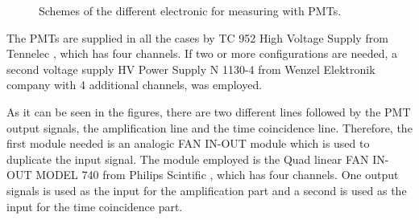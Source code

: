 \begin{figure}[htbp]
 \centering
    \newline  
    \newline
 \caption{Schemes of the different electronic for measuring with PMTs.}
 \label{fig:ElectronicConfiguraitonsPMT}
\end{figure}

The PMTs are supplied in all the cases by TC 952 High Voltage Supply from Tennelec \cite{DataSheetHVSupplyTennelec}, which has four channels. If two or more configurations are needed, a second voltage supply HV Power Supply N 1130-4 from Wenzel Elektronik company \cite{DataSheetHVSupplyWenzel} with 4 additional channels, was employed. 

As it can be seen in the figures, there are two different lines followed by the PMT output signals, the amplification line and the time coincidence line. Therefore, the first module needed is an analogic FAN IN-OUT module which is used to duplicate the input signal. The module employed is the Quad linear FAN IN-OUT MODEL 740 from Philips Scintific \cite{DataSheetFANINOUT}, which has four channels. One output signals is used as the input for the amplification part and a second is used as the input for the time coincidence part.

